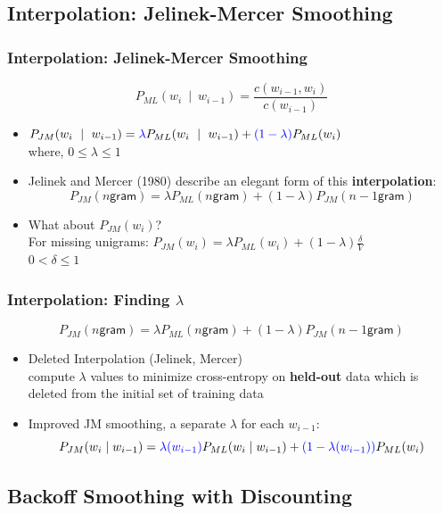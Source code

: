 \subsection{Interpolation: Jelinek-Mercer Smoothing}

\begin{frame}
\frametitle{Interpolation: Jelinek-Mercer Smoothing}
\[ P_{ML}(w_i~\mid~w_{i-1}) = \frac{ c(w_{i-1},w_i) } { c(w_{i-1}) } \]
\begin{itemize}[<+->]
\item $P_{JM}(w_i~\mid~w_{i-1}) = {\color{blue} \lambda} P_{ML}(w_i~\mid~w_{i-1}) +  {\color{blue} (1 - \lambda) }P_{ML}(w_{i})$ \\
 where, $0 \leq \lambda \leq 1$
\item Jelinek and Mercer (1980) describe an elegant form of this {\bf interpolation}:
\[ P_{JM}(\textsf{$n$gram}) = \lambda P_{ML}(\textsf{$n$gram}) + (1 - \lambda) P_{JM}(\textsf{$n-1$gram}) \]
\item What about $P_{JM}(w_i)$? \\
For missing unigrams: $P_{JM}(w_i) = \lambda P_{ML}(w_i) + (1 - \lambda) \frac{\delta}{V}$ \\
$0 < \delta \leq 1$
\end{itemize}
\end{frame}

\begin{frame}
\frametitle{Interpolation: Finding $\lambda$}
\[ P_{JM}(\textsf{$n$gram}) = \lambda P_{ML}(\textsf{$n$gram}) + (1 - \lambda) P_{JM}(\textsf{$n-1$gram}) \]
\begin{itemize}[<+->]
\item Deleted Interpolation (Jelinek, Mercer) \\
compute $\lambda$ values to minimize cross-entropy on {\bf held-out} data which is \alert{deleted} from the initial set of training data
\item Improved JM smoothing, a separate $\lambda$ for each $w_{i-1}$: 
\[ P_{JM}(w_i \mid w_{i-1}) = {\color{blue} \lambda(w_{i-1})} P_{ML}(w_i \mid w_{i-1}) + {\color{blue} (1 - \lambda(w_{i-1}))} P_{ML}(w_i) \]
\end{itemize}
\end{frame}

\subsection{Backoff Smoothing with Discounting}

